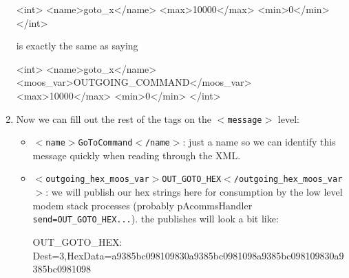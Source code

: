 \documentclass[11pt, letterpaper, oneside]{memoir}
\newcommand{\xmltag}[1]{\texttt{$<$#1$>$}}
\begin{document}
\begin{enumerate}
\begin{small}
\begin{boxedverbatim}
      <int>
        <name>goto_x</name>
        <max>10000</max>
        <min>0</min>
      </int>
\end{boxedverbatim}
\resetbvlinenumber
\end{small}
is exactly the same as saying 
\begin{small}
\begin{boxedverbatim}
      <int>
        <name>goto_x</name>
        <moos_var>OUTGOING_COMMAND</moos_var>
        <max>10000</max>
        <min>0</min>
      </int>
\end{boxedverbatim}
\resetbvlinenumber
\end{small}

\item Now we can fill out the rest of the tags on the \xmltag{message} level:
\begin{itemize}
\item \xmltag{name$>$GoToCommand$<$/name}: just a name so we can identify this message quickly when reading through the XML.
\item \xmltag{outgoing\_hex\_moos\_var$>$OUT\_GOTO\_HEX$<$/outgoing\_hex\_moos\_var}: we will publish our hex strings here for consumption by the low level modem stack processes (probably pAcommsHandler \verb|send=OUT_GOTO_HEX...|). the publishes will look a bit like:
\begin{small}
\begin{boxedverbatim}
OUT_GOTO_HEX: Dest=3,HexData=a9385bc098109830a9385bc0981098a9385bc098109830a9385bc0981098
\end{boxedverbatim}
\resetbvlinenumber
\end{small}


\end{itemize}
\end{enumerate}
\end{document}
